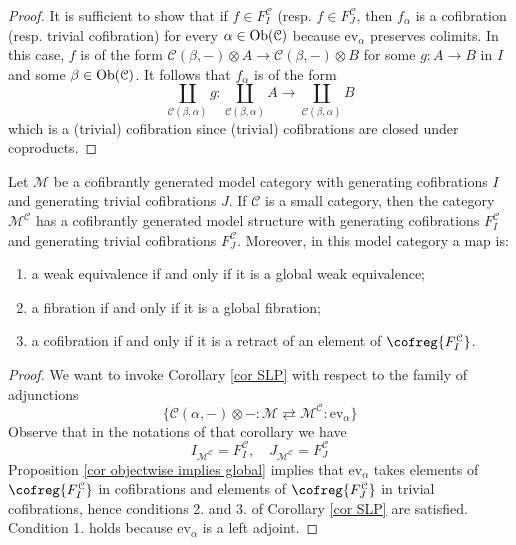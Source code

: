 \begin{refsection}
\begin{proof}
It is sufficient to show that if $f \in F^{\mathcal C}_I$ (resp. $f \in F^{\mathcal C}_J$, then $f_\alpha$ is a cofibration (resp. trivial cofibration) for every $\alpha \in \operatorname{Ob}(\mathcal C)$ because $\mathrm{ev}_\alpha$ preserves colimits. In this case, $f$ is of the form $\mathcal C(\beta,-) \otimes A \to \mathcal C(\beta,-) \otimes B$ for some $g \colon A \to B$ in $I$ and some $\beta \in \operatorname{Ob}(\mathcal C)$. It follows that $f_\alpha$ is of the form
\[
\coprod_{\mathcal C(\beta, \alpha)} g \colon \coprod_{\mathcal C(\beta, \alpha)} A \to \coprod_{\mathcal C(\beta, \alpha)} B
\]
which is a (trivial) cofibration since (trivial) cofibrations are closed under coproducts.
\end{proof}

\begin{thm}
Let $\mathcal M$ be a cofibrantly generated model category with generating cofibrations $I$ and generating trivial cofibrations $J$. If $\mathcal C$ is a small category, then the category $\mathcal M^{\mathcal C}$ has a cofibrantly generated model structure with generating cofibrations $F^{\mathcal C}_I$ and generating trivial cofibrations $F^{\mathcal C}_J$. Moreover, in this model category a map is:
\begin{enumerate}
\item a weak equivalence if and only if it is a global weak equivalence;
\item a fibration if and only if it is a global fibration;
\item a cofibration if and only if it is a retract of an element of $\cofreg{F^{\mathcal C}_I}$.
\end{enumerate}
\end{thm}

\begin{proof}
We want to invoke Corollary \ref{cor SLP} with respect to the family of adjunctions
\[
\{ \mathcal C(\alpha,-) \otimes - \colon \mathcal M \rightleftarrows \mathcal M^{\mathcal C} \colon \mathrm{ev}_\alpha \}
\]
Observe that in the notations of that corollary we have
\[
I_{\mathcal M^{\mathcal C}} = F^{\mathcal C}_I, \quad J_{\mathcal M^{\mathcal C}} = F^{\mathcal C}_J
\]
Proposition \ref{cor objectwise implies global} implies that $\mathrm{ev}_\alpha$ takes elements of $\cofreg{F^{\mathcal C}_I}$ in cofibrations and elements of $\cofreg{F^{\mathcal C}_J}$ in trivial cofibrations, hence conditions 2. and 3. of Corollary \ref{cor SLP} are satisfied. Condition 1. holds because $\mathrm{ev}_\alpha$ is a left adjoint.
\end{proof}


\end{refsection}
